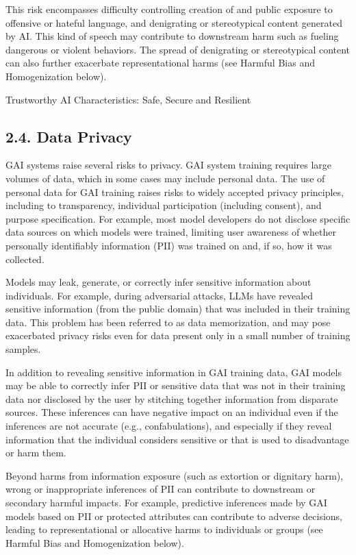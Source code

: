 \documentclass[10pt]{article}
\begin{document}
This risk encompasses difficulty controlling creation of and public exposure to offensive or hateful language, and denigrating or stereotypical content generated by AI. This kind of speech may contribute to downstream harm such as fueling dangerous or violent behaviors. The spread of denigrating or stereotypical content can also further exacerbate representational harms (see Harmful Bias and Homogenization below).

Trustworthy AI Characteristics: Safe, Secure and Resilient
\subsection*{2.4. Data Privacy}
GAI systems raise several risks to privacy. GAI system training requires large volumes of data, which in some cases may include personal data. The use of personal data for GAI training raises risks to widely accepted privacy principles, including to transparency, individual participation (including consent), and purpose specification. For example, most model developers do not disclose specific data sources on which models were trained, limiting user awareness of whether personally identifiably information (PII) was trained on and, if so, how it was collected.

Models may leak, generate, or correctly infer sensitive information about individuals. For example, during adversarial attacks, LLMs have revealed sensitive information (from the public domain) that was included in their training data. This problem has been referred to as data memorization, and may pose exacerbated privacy risks even for data present only in a small number of training samples.

In addition to revealing sensitive information in GAI training data, GAI models may be able to correctly infer PII or sensitive data that was not in their training data nor disclosed by the user by stitching together information from disparate sources. These inferences can have negative impact on an individual even if the inferences are not accurate (e.g., confabulations), and especially if they reveal information that the individual considers sensitive or that is used to disadvantage or harm them.

Beyond harms from information exposure (such as extortion or dignitary harm), wrong or inappropriate inferences of PII can contribute to downstream or secondary harmful impacts. For example, predictive inferences made by GAI models based on PII or protected attributes can contribute to adverse decisions, leading to representational or allocative harms to individuals or groups (see Harmful Bias and Homogenization below).
\end{document}
